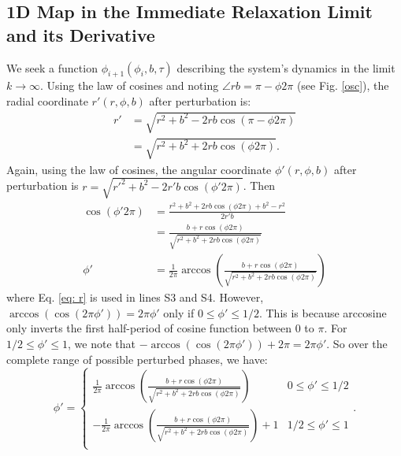 \setcounter{equation}{0}
\setcounter{figure}{0}
\setcounter{table}{0}
\setcounter{page}{1}
\makeatletter

\renewcommand{\theequation}{S\arabic{equation}}
\renewcommand{\thefigure}{S\arabic{figure}}

\subsection{1D Map in the Immediate Relaxation Limit and its Derivative} \label{supp: sub1}
We seek a function $\phi_{i+1}(\phi_i, b, \tau)$ describing the system's dynamics in the limit $k \rightarrow \infty$. Using the law of cosines and noting $\angle{rb}= \pi-\phi 2\pi$ (see Fig. \ref{osc}), the radial coordinate $r'(r,\phi,b)$ after perturbation is:
\begin{align}
    r'&=\sqrt{r^2+b^2-2rb\cos(\pi-\phi 2\pi)}\\
     &=\sqrt{r^2+b^2+2rb\cos(\phi 2\pi)} 
     \label{eq: r}.
\end{align}
Again, using the law of cosines, the angular coordinate $\phi'(r,\phi,b)$ after perturbation is $r =\sqrt{r'^2+b^2-2r'b\cos(\phi' 2\pi)}$. Then 
\begin{align}
    \cos(\phi' 2\pi) &= \frac{r^2+b^2+2rb\cos(\phi 2\pi) +b^2 - r^2}{2r'b} \\
    &= \frac{b+r \cos(\phi 2\pi)}{\sqrt{r^2+b^2+2rb\cos(\phi 2\pi)}} \\
    \phi' &= \frac{1}{2\pi}\arccos(\frac{b+r \cos(\phi 2\pi)}{\sqrt{r^2+b^2+2rb\cos(\phi 2\pi)}})
\end{align} where Eq. \ref{eq: r} is used in lines S3 and S4. However, $\arccos(\cos(2\pi \phi')) = 2\pi \phi'$ only if $0\leq \phi' \leq 1/2$. This is because arccosine only inverts the first half-period of cosine function between $0$ to $\pi$. For $1/2 \leq \phi' \leq 1$, we note that $-\arccos(\cos(2\pi \phi')) +2\pi= 2\pi \phi'$. So over the complete range of possible perturbed phases, we have:
\begin{equation}
    \phi' =
    \begin{cases}
     \frac{1}{2\pi}\arccos(\frac{b+r \cos(\phi 2\pi)}{\sqrt{r^2+b^2+2rb\cos(\phi 2\pi)}}) & 0 \leq \phi' \leq 1/2 \\
    -\frac{1}{2\pi}\arccos(\frac{b+r \cos(\phi 2\pi)}{\sqrt{r^2+b^2+2rb\cos(\phi 2\pi)}}) + 1 & 1/2 \leq \phi' \leq 1 \\
    \end{cases}.
\end{equation}
